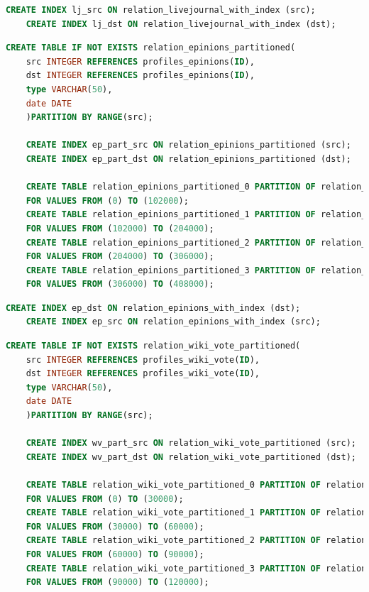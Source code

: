 \begin{lstlisting}[language=SQL,caption=Erstellen von Indexen auf relation Tabelle livejournal,frame=single, label={2.indexlivejournal.listing}]
    CREATE INDEX lj_src ON relation_livejournal_with_index (src);
    CREATE INDEX lj_dst ON relation_livejournal_with_index (dst);
\end{lstlisting}

\begin{lstlisting}[language=SQL,caption=Erstellen von partitionierten Tabellen mit Index epinion,frame=single, label={2.parttableindexepinion.listing}]
    CREATE TABLE IF NOT EXISTS relation_epinions_partitioned(
    src INTEGER REFERENCES profiles_epinions(ID),
    dst INTEGER REFERENCES profiles_epinions(ID),
    type VARCHAR(50),
    date DATE
    )PARTITION BY RANGE(src);

    CREATE INDEX ep_part_src ON relation_epinions_partitioned (src);
    CREATE INDEX ep_part_dst ON relation_epinions_partitioned (dst);

    CREATE TABLE relation_epinions_partitioned_0 PARTITION OF relation_epinions_partitioned
    FOR VALUES FROM (0) TO (102000);
    CREATE TABLE relation_epinions_partitioned_1 PARTITION OF relation_epinions_partitioned
    FOR VALUES FROM (102000) TO (204000);
    CREATE TABLE relation_epinions_partitioned_2 PARTITION OF relation_epinions_partitioned
    FOR VALUES FROM (204000) TO (306000);
    CREATE TABLE relation_epinions_partitioned_3 PARTITION OF relation_epinions_partitioned
    FOR VALUES FROM (306000) TO (408000);
\end{lstlisting}

\begin{lstlisting}[language=SQL,caption=Erstellen von Indexen auf relation Tabelle epinion,frame=single, label={2.indexepinion.listing}]
    CREATE INDEX ep_dst ON relation_epinions_with_index (dst);
    CREATE INDEX ep_src ON relation_epinions_with_index (src);
\end{lstlisting}

\begin{lstlisting}[language=SQL,caption=Erstellen von partitionierten Tabellen mit wikivote epinion,frame=single, label={2.parttableindexwikivote.listing}]
    CREATE TABLE IF NOT EXISTS relation_wiki_vote_partitioned(
    src INTEGER REFERENCES profiles_wiki_vote(ID),
    dst INTEGER REFERENCES profiles_wiki_vote(ID),
    type VARCHAR(50),
    date DATE
    )PARTITION BY RANGE(src);

    CREATE INDEX wv_part_src ON relation_wiki_vote_partitioned (src);
    CREATE INDEX wv_part_dst ON relation_wiki_vote_partitioned (dst);

    CREATE TABLE relation_wiki_vote_partitioned_0 PARTITION OF relation_wiki_vote_partitioned
    FOR VALUES FROM (0) TO (30000);
    CREATE TABLE relation_wiki_vote_partitioned_1 PARTITION OF relation_wiki_vote_partitioned
    FOR VALUES FROM (30000) TO (60000);
    CREATE TABLE relation_wiki_vote_partitioned_2 PARTITION OF relation_wiki_vote_partitioned
    FOR VALUES FROM (60000) TO (90000);
    CREATE TABLE relation_wiki_vote_partitioned_3 PARTITION OF relation_wiki_vote_partitioned
    FOR VALUES FROM (90000) TO (120000);
\end{lstlisting}

